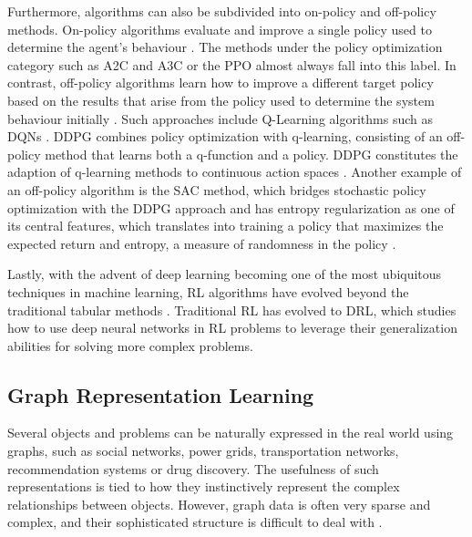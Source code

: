 \documentclass[11pt,a4paper]{article}
\begin{document}
Furthermore, algorithms can also be subdivided into on-policy and off-policy methods. \cite{moralesGrokkingDeepReinforcement2020} On-policy algorithms evaluate and improve a single policy used to determine the agent's behaviour \cite{moralesGrokkingDeepReinforcement2020}. The methods under the policy optimization category such as A2C and A3C \cite{mnihAsynchronousMethodsDeep2016} or the \ac{PPO} \cite{schulmanProximalPolicyOptimization2017} almost always fall into this label. In contrast, off-policy algorithms learn how to improve a different target policy based on the results that arise from the policy used to determine the system behaviour initially \cite{moralesGrokkingDeepReinforcement2020}. Such approaches include Q-Learning algorithms such as \acp{DQN} \cite{mnihHumanlevelControlDeep2015, openaiSpinningDocumentation}. \ac{DDPG} \cite{lillicrapContinuousControlDeep2019} combines policy optimization with q-learning, consisting of an off-policy method that learns both a q-function and a policy. \ac{DDPG} constitutes the adaption of q-learning methods to continuous action spaces \cite{openaiSpinningDocumentation}. Another example of an off-policy algorithm is the \ac{SAC} \cite{haarnojaSoftActorCriticOffPolicy2018} method, which bridges stochastic policy optimization with the \ac{DDPG} approach and has entropy regularization as one of its central features, which translates into training a policy that maximizes the expected return and entropy, a measure of randomness in the policy \cite{openaiSpinningDocumentation}. \par
Lastly, with the advent of deep learning becoming one of the most ubiquitous techniques in machine learning, \ac{RL} algorithms have evolved beyond the traditional tabular methods \cite{moralesGrokkingDeepReinforcement2020}. Traditional \ac{RL} has evolved to \ac{DRL}, which studies how to use deep neural networks in \ac{RL} problems to leverage their generalization abilities for solving more complex problems.

\subsection{Graph Representation Learning}

Several objects and problems can be naturally expressed in the real world using graphs, such as social networks, power grids, transportation networks, recommendation systems or drug discovery. The usefulness of such representations is tied to how they instinctively represent the complex relationships between objects. However, graph data is often very sparse and complex, and their sophisticated structure is difficult to deal with \cite{liuIntroductionGraphNeural2020, zhaoRepresentationLearning2022}. \par
\end{document}
